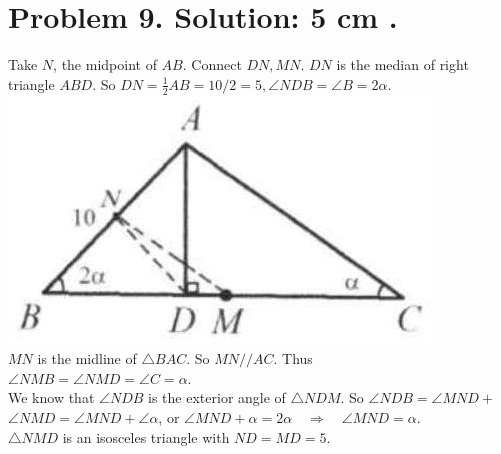 \documentclass[10pt]{article}
\begin{document}
\section*{Problem 9. Solution: 5 cm .}
Take \(N\), the midpoint of \(A B\). Connect \(D N, M N\). \(D N\) is the median of right triangle \(A B D\). So \(D N=\frac{1}{2} A B=10 / 2=5, \angle N D B=\angle B=2 \alpha\).\\
\includegraphics[max width=\textwidth, center]{2025_04_17_97bc1f7e44d93c271a88g-051(1)}\\
\(M N\) is the midline of \(\triangle B A C\). So \(M N / / A C\). Thus\\
\(\angle N M B=\angle N M D=\angle C=\alpha\).\\
We know that \(\angle N D B\) is the exterior angle of \(\triangle N D M\). So \(\angle N D B=\angle M N D+\) \(\angle N M D=\angle M N D+\angle \alpha\), or \(\angle M N D+\alpha=2 \alpha \quad \Rightarrow \quad \angle M N D=\alpha\).\\
\(\triangle N M D\) is an isosceles triangle with \(N D=M D=5\).
\end{document}
